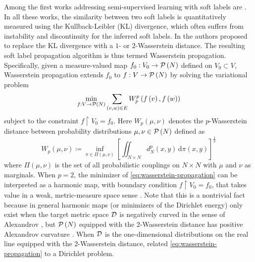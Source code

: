 \documentclass[letterpaper]{article} %
\begin{document}
Among the first works addressing semi-supervised learning with soft labels are \cite{Distribution_Propagation1,Distribution_Propagation2,SSL_Measure_Propagation}. In all these works, the similarity between two soft labels is quantitatively measured using the Kullback-Leibler (KL) divergence, which often suffers from instability and discontinuity for the inferred soft labels. In \cite{Solomon:2014} the authors proposed to replace the KL divergence with a $1$- or $2$-Wasserstein distance. The resulting soft label propagation algorithm is thus termed Wasserstein propagation. Specifically, given a measure-valued map $f_0:V_0\rightarrow\P \left( N \right)$ defined on $V_0\subset V$, Wasserstein propagation extends $f_0$ to $f:V\rightarrow \P \left( N \right)$ by solving the variational problem
\begin{equation}
  \label{eq:wasserstein-propagation}
  \min_{f:V\rightarrow\P \left( N \right)}\sum_{\left( v,w \right)\in E}W_p^p \left( f \left( v \right), f \left( w \right) \right)
\end{equation}
subject to the constraint $f\restriction V_0=f_0$. Here $W_p \left( \mu,\nu \right)$ denotes the $p$-Wasserstein distance between probability distributions $\mu,\nu\in\P \left( N \right)$ defined as
\begin{equation}
  \label{eq:wasserstein-distance}
  W_p \left( \mu,\nu \right)\coloneqq\inf_{\pi\in\Pi \left( \mu,\nu \right)}\left[\iint_{N\times N}d^p_N \left( x,y \right)\,\mathrm{d}\pi \left( x,y \right)\right]^{\frac{1}{p}}
\end{equation}
where $\Pi \left( \mu,\nu \right)$ is the set of all probabilistic couplings on $N\times N$ with $\mu$ and $\nu$ as marginals. When $p=2$, the minimizer of \eqref{eq:wasserstein-propagation} can be interpreted as a harmonic map, with boundary condition $f\restriction V_0=f_0$, that takes value in a weak, metric-measure space sense \cite{Otto2001,ambrosio2005gradient,LottVillani2009,Dirichlet_Wasserstein}. Note that this is a nontrivial fact because in general harmonic maps (or minimizers of the Dirichlet energy) only exist when the target metric space $\D$ is negatively curved in the sense of Alexandrov \cite{Jost}, but $\P \left( N \right)$ equipped with the $2$-Wasserstein distance has positive Alexandrov curvature \cite[]{ambrosio2005gradient}. When $\D$ is the one-dimensional distributions on the real line equipped with the $2$-Wasserstein distance, \cite{Solomon:2014} related \eqref{eq:wasserstein-propagation} to a Dirichlet problem.
\end{document}
